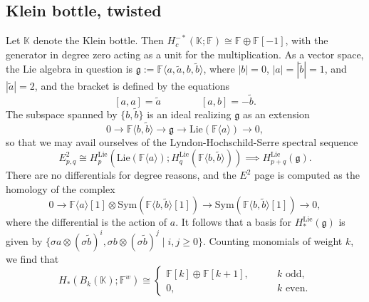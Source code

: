 \documentclass{compositio}
\theoremstyle{definition}\newtheorem{definition}{Definition}[section]
\theoremstyle{theorem}\newtheorem{lemma}[definition]{Lemma}
\theoremstyle{remark}\newtheorem*{conventions}{Conventions}
\theoremstyle{remark}\newtheorem*{acknowledgments}{Acknowledgments}
\theoremstyle{remark}\newtheorem*{outline}{Outline}
\theoremstyle{remark}\newtheorem*{questions}{Questions}
\theoremstyle{remark}\newtheorem{example}[definition]{Example}
\theoremstyle{definition}\newtheorem{construction}[definition]{Construction}
\theoremstyle{definition}\newtheorem*{convention}{Convention}
\theoremstyle{definition}\newtheorem*{conjecture}{Conjecture}
\theoremstyle{theorem}\newtheorem{theorem}[definition]{Theorem}
\theoremstyle{theorem}\newtheorem{paradigm}[definition]{Paradigm}
\theoremstyle{remark}\newtheorem{remark}[definition]{Remark}
\theoremstyle{corollary}\newtheorem{corollary}[definition]{Corollary}
\theoremstyle{theorem}\newtheorem{proposition}[definition]{Proposition}
\theoremstyle{definition}\newtheorem{question}[definition]{Question}
\begin{document}
\subsection{Klein bottle, twisted}
Let $\mathbb{K}$ denote the Klein bottle. Then $H_c^{-*}(\mathbb{K};\mathbb{F})\cong \mathbb{F}\oplus\mathbb{F}[-1]$, with the generator in degree zero acting as a unit for the multiplication. As a vector space, the Lie algebra in question is $\mathfrak{g}:=\mathbb{F}\langle a, \tilde a, b, \tilde b\rangle$, where $|b|=0$, $|a|=|\tilde b|=1$, and $|\tilde a|=2$, and the bracket is defined by the equations $$[a,a]=\tilde a\qquad\qquad [a,b]=-\tilde b.$$ The subspace spanned by $\{b,\tilde b\}$ is an ideal realizing $\mathfrak{g}$ as an extension $$0\to \mathbb{F}\langle b,\tilde b\rangle\to\mathfrak{g}\to {\mathrm{Lie}}(\mathbb{F}\langle a\rangle)\to0,$$ so that we may avail ourselves of the Lyndon-Hochschild-Serre spectral sequence $$E^2_{p,q}\cong H^{\mathrm{Lie}}_p({\mathrm{Lie}}(\mathbb{F}\langle a\rangle);H^{\mathrm{Lie}}_q(\mathbb{F}\langle b,\tilde b\rangle))\implies H^{\mathrm{Lie}}_{p+q}(\mathfrak{g}).$$ There are no differentials for degree reasons, and the $E^2$ page is computed as the homology of the complex $$0\to \mathbb{F}\langle a\rangle[1]\otimes {\mathrm{Sym}}(\mathbb{F}\langle b,\tilde b\rangle[1])\to {\mathrm{Sym}}(\mathbb{F}\langle b,\tilde b\rangle[1])\to 0,$$ where the differential is the action of $a$. It follows that a basis for $H_*^{\mathrm{Lie}}(\mathfrak{g})$ is given by $\{\sigma a\otimes (\sigma\tilde b)^i,\sigma b\otimes(\sigma\tilde b)^j\mid i,j\geq0\}.$ Counting monomials of weight $k$, we find that $$H_*(B_k(\mathbb{K});\mathbb{F}^w)\cong\begin{cases}
\mathbb{F}[k]\oplus \mathbb{F}[k+1],\qquad &k\text{ odd,}\\
0,\qquad\qquad &k\text{ even.}
\end{cases}$$
\end{document}
